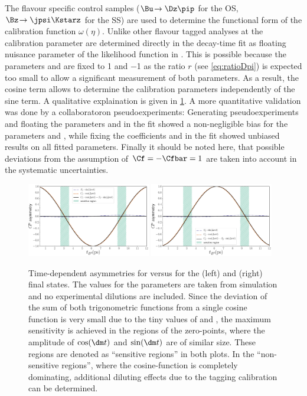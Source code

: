 The flavour specific control samples ($\Bu\!\to\Dz\pip$ for the OS, $\Bz\!\to\jpsi\Kstarz$ for the SS) are used to determine the functional form of the calibration function $\omega(\eta)$.
Unlike other flavour tagged analyses at \lhcb the calibration parameter are determined directly in the decay-time fit as floating nuisance parameter of the likelihood function in \BdToDpi.
This is possible because the parameters \Cf and \Cfbar are fixed to \num{1} and \num{-1} as the ratio $r$ (see \cref{eq:ratioDpi}) is expected too small to allow a significant measurement of both parameters.
As a result, the cosine term allows to determine the calibration parameters independently of the sine term.
A qualitative explaination is given in \cref{fig:FTstrategy}.
A more quantitative validation was done by a collaboratoron pseudoexperiments:
Generating pseudoexperiments and floating the parameters \Cf and \Cfbar in the fit showed a non-negligible bias for the parameters \Sf and \Sfbar, while fixing the coefficients \Cf and \Cfbar in the fit showed unbiased results on all fitted parameters.
Finally it should be noted here, that possible deviations from the assumption of $\Cf=-\Cfbar=1$ are taken into account in the systematic uncertainties.
\begin{figure}[tbp]
    \centering
    \includegraphics[width=0.48\textwidth]{08FlavourTagging/figs/oscillation_f.pdf}
    \includegraphics[width=0.48\textwidth]{08FlavourTagging/figs/oscillation_fbar.pdf}
    \caption{Time-dependent asymmetries for \Bzb versus \Bz for the \Dm\pip (left) and \Dp\pim (right) final states.
    The values for the \CP parameters are taken from simulation and no experimental dilutions are included.
    Since the deviation of the sum of both trigonometric functions from a single cosine function is very small due to the tiny values of \Sf and \Sfbar, the maximum sensitivity is achieved in the regions of the zero-points, \ie where the amplitude of $\cos(\dm t)$ and $\sin(\dm t)$ are of similar size.
    These regions are denoted as \enquote{sensitive regions} in both plots.
    In the \enquote{non-sensitive regions}, where the cosine-function is completely dominating, additional diluting effects due to the tagging calibration can be determined.}
    \label{fig:FTstrategy}
\end{figure}

